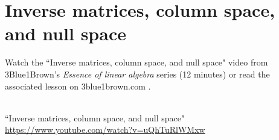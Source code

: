 \section{Inverse matrices, column space, and null space}

Watch the ``Inverse matrices, column space, and null space" video from
3Blue1Brown's \textit{Essence of linear algebra} series (12 minutes) or read the
associated lesson on 3blue1brown.com
\cite{bib:3b1b_linalg_inverse_matrices_column_space_and_null_space}.
\begin{bookfigure}
   \\
  \tiny
  ``Inverse matrices, column space, and null space" \\
  \url{https://www.youtube.com/watch?v=uQhTuRlWMxw}
\end{bookfigure}
